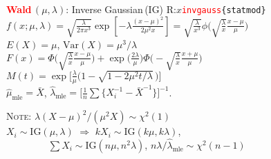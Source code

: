 \documentclass[10pt]{article}
\newenvironment{LIST}[1]{\begin{list}{}
                          { \settowidth{\labelwidth}{#1}
                            \setlength{\leftmargin}{\labelwidth}
                            \addtolength{\leftmargin}{\labelsep}
                            \setlength{\parsep}{0.5ex plus0.2ex minus0.2ex}
                            \setlength{\itemsep}{0ex plus0.2ex}
                            \renewcommand{\makelabel}[1]{##1\hfill}
                          }
                        }
                        {\end{list}}
\begin{document}
\begin{multicols}{2}
\begin{small}
\begin{enumerate}
\item \textcolor{red}{\bfseries\textsf{Wald}}\,$(\mu,\lambda)$: Inverse Gaussian\,(IG)  \hfill 
      \textsf{R:}$x$\texttt{\textcolor{red}{invgauss}\{statmod\}} \\
      $f(x;\mu,\lambda) = \sqrt{\frac{\lambda}{2\pi x^3}}
             \exp\left[-\lambda\frac{(x-\mu)^2}{2\mu^2 x}\right]
  =\sqrt{\frac{\lambda}{x^3}} \phi\Big(\sqrt{\frac{\lambda}{x}}\frac{x-\mu}{\mu}\Big)$\\
      $E(X)=\mu$, $\textrm{Var}(X)=\mu^3/\lambda$\\
      $F(x) = \Phi\Big( \sqrt{\frac{\lambda}{x}} \frac{x-\mu}{\mu}\Big)
            +\exp\Big(\frac{2\lambda}{\mu}\Big) 
              \Phi\Big(-\sqrt{\frac{\lambda}{x}} \frac{x+\mu}{\mu} \Big) $ \\
    $M(t)=\exp\Big[  \frac{\lambda}{\mu}
     \big( 1-\sqrt{1-{2\mu^2 t}/{\lambda}}\,\big)  \Big]$  \\
   $\hat{\mu}_{\textrm{mle}}=\bar{X}$, 
   $\hat{\lambda}_{\textrm{mle}}=
      \Big[ \frac{1}{n}\sum\big\{ X_i^{-1}-\bar{X}^{-1}\big\}\Big]^{-1}$.
      \begin{LIST}{\textsc{Note:}}
      \item[\textsc{Note:}] 
       $\lambda(X-\mu)^2/(\mu^2 X) \sim \chi^2(1)$ \\
       $X_i\sim\textrm{IG}(\mu,\lambda)$ $\!\Rightarrow\!$
       $k X_i \sim\textrm{IG}(k\mu,k\lambda)$,    \\
       ${\qquad\qquad}$ $\sum X_i \sim\textrm{IG}(n\mu, n^2\lambda)$,  
       $n\lambda/\hat{\lambda}_{\textrm{mle}} \sim \chi^2(n-1)$
      \end{LIST}


\end{enumerate}
\end{small}
\end{multicols}
\end{document}
